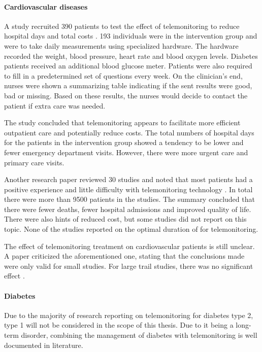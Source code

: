         \paragraph{Cardiovascular diseases} A study recruited 390 patients to test the effect of telemonitoring to reduce hospital days and total costs \cite{tompkins2010randomized}. 193 individuals were in the intervention group and were to take daily measurements using specialized hardware. The hardware recorded the weight, blood pressure, heart rate and blood oxygen levels. Diabetes patients received an additional blood glucose meter. Patients were also required to fill in a predetermined set of questions every week. On the clinician's end, nurses were shown a summarizing table indicating if the sent results were good, bad or missing. Based on these results, the nurses would decide to contact the patient if extra care was needed.

        The study concluded that telemonitoring appears to facilitate more efficient outpatient care and potentially reduce costs. The total numbers of hospital days for the patients in the intervention group showed a tendency to be lower and fewer emergency department visits. However, there were more urgent care and primary care visits.

        Another research paper reviewed 30 studies and noted that most patients had a positive experience and little difficulty with telemonitoring technology \cite{inglis2010structured}. In total there were more than 9500 patients in the studies. The summary concluded that there were fewer deaths, fewer hospital admissions and improved quality of life. There were also hints of reduced cost, but some studies did not report on this topic. None of the studies reported on the optimal duration of for telemonitoring.
        
        The effect of telemonitoring treatment on cardiovascular patients is still unclear. A paper criticized the aforementioned one, stating that the conclusions made were only valid for small studies. For large trail studies, there was no significant effect \cite{chaudhry2010telemonitoring}.

        \paragraph{Diabetes} Due to the majority of research reporting on telemonitoring for diabetes type 2, type 1 will not be considered in the scope of this thesis. Due to it being a long-term disorder, combining the management of diabetes with telemonitoring is well documented in literature.

